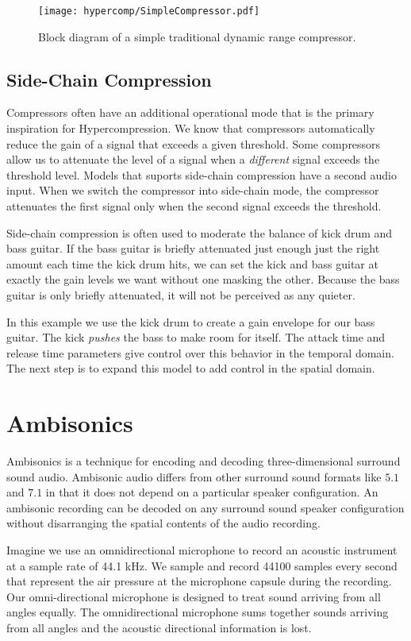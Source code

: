 \begin{figure*}
  \texttt{[image: hypercomp/SimpleCompressor.pdf]}
  \caption{Block diagram of a simple traditional dynamic range
    compressor.}
  \label{fig:comp-block}
\end{figure*}

\subsection{Side-Chain Compression}
\label{sec:side-chain-compr}
Compressors often have an additional operational mode that is the
primary inspiration for Hypercompression. We know that compressors
automatically reduce the gain of a signal that exceeds a given
threshold. Some compressors allow us to attenuate the level of a
signal when a \emph{different} signal exceeds the threshold
level. Models that suports side-chain compression have a second audio
input. When we switch the compressor into side-chain mode, the
compressor attenuates the first signal only when the second signal
exceeds the threshold.

Side-chain compression is often used to moderate the balance of kick
drum and bass guitar. If the bass guitar is briefly attenuated just
enough just the right amount each time the kick drum hits, we can set
the kick and bass guitar at exactly the gain levels we want without
one masking the other. Because the bass guitar is only briefly
attenuated, it will not be perceived as any quieter.

In this example we use the kick drum to create a gain envelope for our
bass guitar. The kick \emph{pushes} the bass to make room for
itself. The attack time and release time parameters give control over
this behavior in the temporal domain. The next step is to
expand this model to add control in the spatial domain.

\section{Ambisonics}
\label{sec:ambisonics}
Ambisonics is a technique for encoding and decoding three-dimensional
surround sound audio.\cite[-15mm]{Gerzon1973,Gerzon1985} Ambisonic
audio differs from other surround sound formats like $5.1$ and $7.1$
in that it does not depend on a particular speaker configuration. An
ambisonic recording can be decoded on any surround sound speaker
configuration without disarranging the spatial contents of the audio
recording.

Imagine we use an omnidirectional microphone to record an acoustic
instrument at a sample rate of 44.1 kHz. We sample and record 44100
samples every second that represent the air pressure at the microphone
capsule during the recording. Our omni-directional microphone is
designed to treat sound arriving from all angles equally. The
omnidirectional microphone sums together sounds arriving from all
angles and the acoustic directional information is lost.

